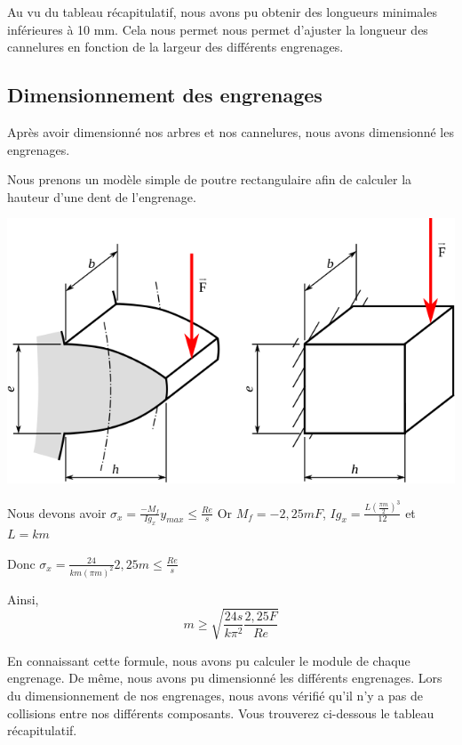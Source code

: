 \documentclass{config}
\begin{document}
\begin{spacing}{1.2}
Au vu du tableau récapitulatif, nous avons pu obtenir des longueurs minimales inférieures à 10 mm. Cela nous permet nous permet d'ajuster la longueur des cannelures en fonction de la largeur des différents engrenages. 

\newpage
\subsection{Dimensionnement des engrenages}

Après avoir dimensionné nos arbres et nos cannelures, nous avons dimensionné les engrenages.

Nous prenons un modèle simple de poutre rectangulaire afin de calculer la hauteur d'une dent de l'engrenage.

\begin{center}
\includegraphics[scale=0.6]{Flexion_dent_engrenage_modele_lewis.png}
\end{center}

Nous devons avoir $\sigma_{x} = \frac{- M_f}{Ig_x} y_{max} \leq \frac{Re}{s}$
Or $M_f = -2,25 mF $,  $ Ig_x =\frac{L (\frac{\pi m}{2})^3}{12}$ et $L = k m$

Donc $\sigma_{x} = \frac{24}{k m (\pi m)^2} 2,25m \leq \frac{Re}{s} $

Ainsi, \[ m \geq \sqrt{\frac{24 s}{ k \pi^2}\frac{2,25F}{Re}}\]

En connaissant cette formule, nous avons pu calculer le module de chaque engrenage. De même, nous avons pu dimensionné les différents engrenages. Lors du dimensionnement de nos engrenages, nous avons vérifié qu'il n'y a pas de collisions entre nos différents composants. Vous trouverez ci-dessous le tableau récapitulatif.



\end{spacing}
\end{document}
